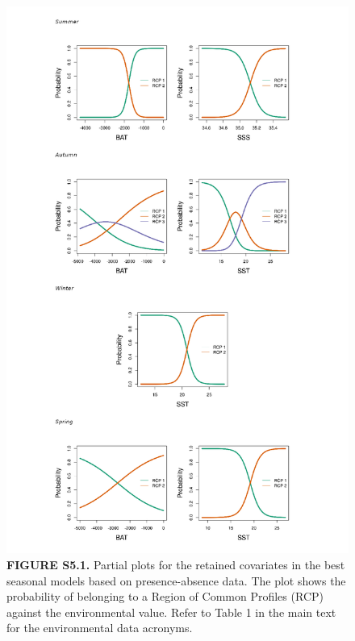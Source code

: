 \documentclass[
]{article}
\begin{document}
\begin{figure}
\centering
\includegraphics{../results/FigS6_1_partial-plots-Bernoulli.png}
\caption{\textbf{FIGURE S5.1.} Partial plots for the retained covariates
in the best seasonal models based on presence-absence data. The plot
shows the probability of belonging to a Region of Common Profiles (RCP)
against the environmental value. Refer to Table 1 in the main text for
the environmental data acronyms.}
\end{figure}

\newpage
\end{document}
